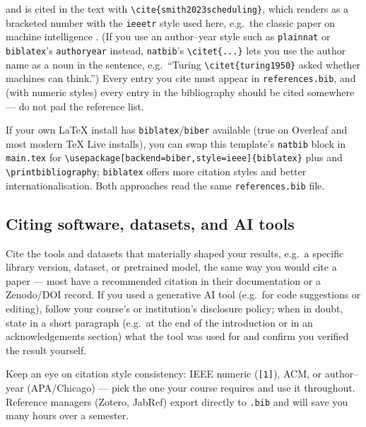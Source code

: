 and is cited in the text with \verb|\cite{smith2023scheduling}|, which
renders as a bracketed number with the \texttt{ieeetr} style used here,
e.g.\ the classic paper on machine intelligence \cite{turing1950}. (If
you use an author--year style such as \texttt{plainnat} or
\texttt{biblatex}'s \texttt{authoryear} instead, \texttt{natbib}'s
\verb|\citet{...}| lets you use the author name as a noun in the
sentence, e.g.\ ``Turing \verb|\citet{turing1950}| asked whether
machines can think.'') Every entry you cite must appear in
\texttt{references.bib},
and (with numeric styles) every entry in the bibliography should be
cited somewhere --- do not pad the reference list.

\begin{tipbox}
  If your own \LaTeX{} install has \texttt{biblatex}/\texttt{biber}
  available (true on Overleaf and most modern TeX Live installs), you can
  swap this template's \texttt{natbib} block in \texttt{main.tex} for
  \verb|\usepackage[backend=biber,style=ieee]{biblatex}| plus
  \verb|| and
  \verb|\printbibliography|; \texttt{biblatex} offers more citation
  styles and better internationalisation. Both approaches read the same
  \texttt{references.bib} file.
\end{tipbox}

\subsection{Citing software, datasets, and AI tools}
Cite the tools and datasets that materially shaped your results, e.g.\ a
specific library version, dataset, or pretrained model, the same way you
would cite a paper --- most have a recommended citation in their
documentation or a Zenodo/DOI record. If you used a generative AI tool
(e.g.\ for code suggestions or editing), follow your course's or
institution's disclosure policy; when in doubt, state in a short
paragraph (e.g.\ at the end of the introduction or in an
acknowledgements section) what the tool was used for and confirm you
verified the result yourself.

\begin{tipbox}
  Keep an eye on citation style consistency: IEEE numeric
  (\texttt{[1]}), ACM, or author--year (APA/Chicago) --- pick the one your
  course requires and use it throughout. Reference managers (Zotero,
  JabRef) export directly to \texttt{.bib} and will save you many hours
  over a semester.
\end{tipbox}
